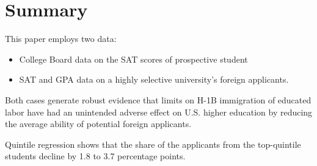 \documentclass[../root]{subfiles}
\begin{document}
    
    \section{Summary}
    
    This paper employs two data:
    \begin{itemize}
        \item College Board data on the SAT scores of prospective student 
        \item SAT and GPA data on a highly selective university's foreign applicants.
    \end{itemize}
    Both cases generate robust evidence that limits on H-1B immigration of educated labor have had an unintended adverse effect on U.S. higher education by reducing the average ability of potential foreign applicants.
    
    Quintile regression shows that the share of the applicants from the top-quintile students decline by 1.8 to 3.7 percentage points. 
    
    \biblio
    
\end{document}
